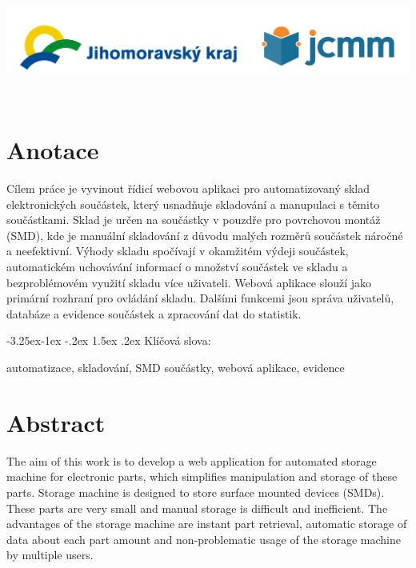 \documentclass[12pt, a4paper, oneside]{article}
\makeatletter
\renewcommand\paragraph{\@startsection{paragraph}{4}{\z@}%
      {-3.25ex\@plus -1ex \@minus -.2ex}%
      {1.5ex \@plus .2ex}%
      {\normalfont\normalsize\bfseries}}
\makeatother
\begin{document}
\hfill\\[\intextsep]
\begin{minipage}{\textwidth}
\begin{center}
\includegraphics[scale=0.28]{img/loga_podekovani.png}
\end{center}
\end{minipage}
\vspace{2mm}
\normalsize

\newpage   %
~ %
\vspace{5mm}

\section*{Anotace}

Cílem práce je vyvinout řídicí webovou aplikaci pro automatizovaný sklad elektronických součástek, který usnadňuje skladování a manupulaci s těmito součástkami. Sklad je určen na součástky v pouzdře pro povrchovou montáž (SMD), kde je manuální skladování z důvodu malých rozměrů součástek náročné a neefektivní. Výhody skladu spočívají v okamžitém výdeji součástek, automatickém uchovávání informací o množství součástek ve skladu a bezproblémovém využití skladu více uživateli.
Webová aplikace slouží jako primární rozhraní pro ovládání skladu. Dalšími funkcemi jsou správa uživatelů, databáze a evidence součástek a zpracování dat do statistik.


\paragraph{Klíčová slova:}

automatizace, skladování, SMD součástky, webová aplikace, evidence

\vspace{18mm}

\section*{Abstract}

The aim of this work is to develop a web application for automated storage machine for electronic parts, which simplifies manipulation and storage of these parts. Storage machine is designed to store surface mounted devices (SMDs). These parts are very small and manual storage is difficult and inefficient. The advantages of the storage machine are instant part retrieval, automatic storage of data about each part amount and non-problematic usage of the storage machine by multiple users.
\end{document}
